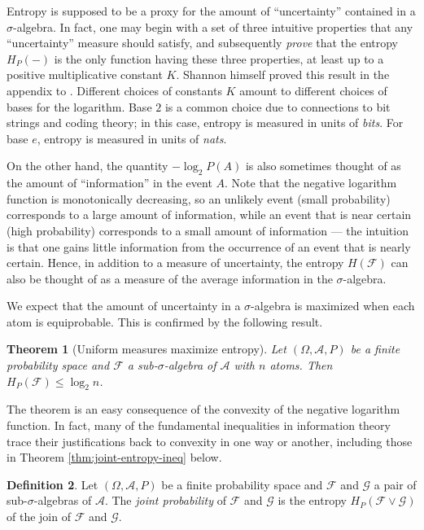 \documentclass[11pt]{book}
\newtheorem{thm}{Theorem}[section]
\theoremstyle{definition}
\newtheorem{defn}[thm]{Definition}
\numberwithin{equation}{section}
\begin{document}
Entropy is supposed to be a proxy for the amount of ``uncertainty'' contained in a $\sigma$-algebra. In fact, one may begin with a set of three intuitive properties that any ``uncertainty'' measure should satisfy, and subsequently \textit{prove} that the entropy $H_P(-)$ is the only function having these three properties, at least up to a positive multiplicative constant $K$. Shannon himself proved this result in the appendix to \cite{Shannon1948}. Different choices of constants $K$ amount to different choices of bases for the logarithm. Base $2$ is a common choice due to connections to bit strings and coding theory; in this case, entropy is measured in units of \textit{bits}. For base $e$, entropy is measured in units of \textit{nats}.

On the other hand, the quantity $-\log_2{P(A)}$ is also sometimes thought of as the amount of ``information'' in the event $A$. Note that the negative logarithm function is monotonically decreasing, so an unlikely event (small probability) corresponds to a large amount of information, while an event that is near certain (high probability) corresponds to a small amount of information — the intuition is that one gains little information from the occurrence of an event that is nearly certain. Hence, in addition to a measure of uncertainty, the entropy $H(\mathcal{F})$ can also be thought of as a measure of the average information in the $\sigma$-algebra.

We expect that the amount of uncertainty in a $\sigma$-algebra is maximized when each atom is equiprobable. This is confirmed by the following result.

\begin{thm}[Uniform measures maximize entropy]\label{thm:max-entropy}
	Let $(\Omega,\mathcal{A},P)$ be a finite probability space and $\mathcal{F}$ a sub-$\sigma$-algebra of $\mathcal{A}$ with $n$ atoms. Then $H_P(\mathcal{F}) \leq \log_2{n}$.
\end{thm}

The theorem is an easy consequence of the convexity of the negative logarithm function. In fact, many of the fundamental inequalities in information theory trace their justifications back to convexity in one way or another, including those in Theorem \ref{thm:joint-entropy-ineq} below.

\begin{defn}
	Let $(\Omega,\mathcal{A},P)$ be a finite probability space and $\mathcal{F}$ and $\mathcal{G}$ a pair of sub-$\sigma$-algebras of $\mathcal{A}$. The \textit{joint probability} of $\mathcal{F}$ and $\mathcal{G}$ is the entropy $H_P(\mathcal{F} \vee \mathcal{G})$ of the join of $\mathcal{F}$ and $\mathcal{G}$.
\end{defn}
\end{document}
